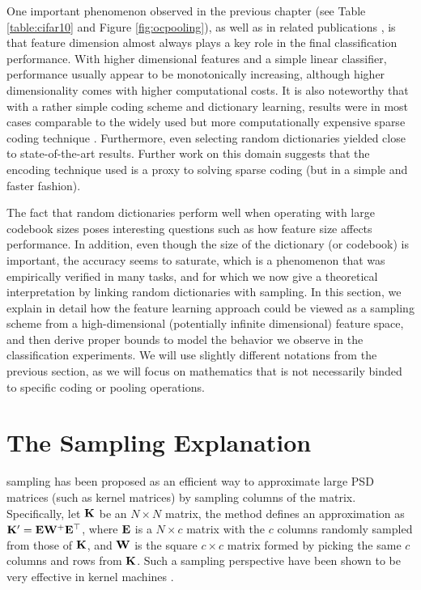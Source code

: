 
One important phenomenon observed in the previous chapter (see \eg Table \ref{table:cifar10} and Figure \ref{fig:ocpooling}), as well as in related publications \cite{coates2010aistats,coates2011icml}, is that feature dimension almost always plays a key role in the final classification performance. With higher dimensional features and a simple linear classifier, performance usually appear to be monotonically increasing, although higher dimensionality comes with higher computational costs. It is also noteworthy that with a rather simple coding scheme and dictionary learning, results were in most cases comparable to the widely used but more computationally expensive sparse coding technique \cite{coates2011icml}. Furthermore, even selecting random dictionaries yielded close to state-of-the-art results. Further work on this domain \cite{freitas} suggests that the encoding technique used is a proxy to solving sparse coding (but in a simple and faster fashion).

The fact that random dictionaries perform well when operating with large codebook sizes poses interesting questions such as how feature size affects performance. In addition, even though the size of the dictionary (or codebook) is important, the accuracy seems to saturate, which is a phenomenon that was empirically verified in many tasks, and for which we now give a theoretical interpretation by linking random dictionaries with \nystrom sampling. In this section, we explain in detail how the feature learning approach could be viewed as a \nystrom sampling scheme from a high-dimensional (potentially infinite dimensional) feature space, and then derive proper bounds to model the behavior we observe in the classification experiments. We will use slightly different notations from the previous section, as we will focus on mathematics that is not necessarily binded to specific coding or pooling operations.

\section{The \nystrom Sampling Explanation}
\nystrom sampling has been proposed as an efficient way to approximate large PSD matrices (such as kernel matrices) by sampling columns of the matrix. Specifically, let $\mathbf{K}$ be an $N\times N$ matrix, the \nystrom method defines an approximation as $\mathbf{K}' = \mathbf{E}\mathbf{W}^{+}\mathbf{E}^\top$, where $\mathbf{E}$ is a $N\times c$ matrix with the $c$ columns randomly sampled from those of $\mathbf{K}$, and $\mathbf{W}$ is the square $c\times c$ matrix formed by picking the same $c$ columns and rows from $\mathbf{K}$. Such a sampling perspective have been shown to be very effective in kernel machines \cite{zhang2008improved,cortes10,kumar2012sampling}.

